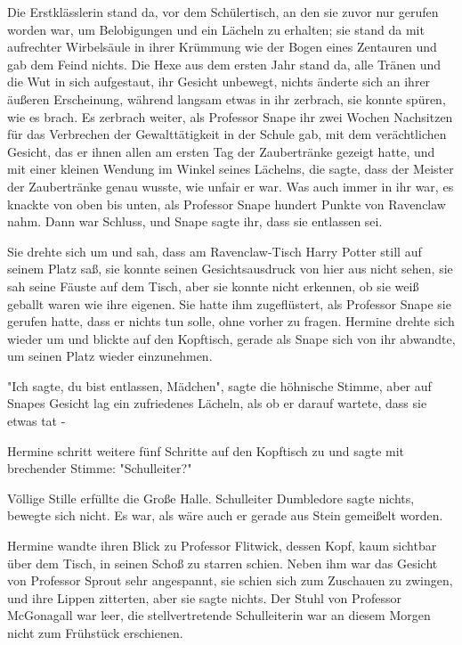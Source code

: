 {Die Erstklässlerin stand da, vor dem Schülertisch, an den sie zuvor nur gerufen worden war, um Belobigungen und ein Lächeln zu erhalten; sie stand da mit aufrechter Wirbelsäule in ihrer Krümmung wie der Bogen eines Zentauren und gab dem Feind nichts. Die Hexe aus dem ersten Jahr stand da, alle Tränen und die Wut in sich aufgestaut, ihr Gesicht unbewegt, nichts änderte sich an ihrer äußeren Erscheinung, während langsam etwas in ihr zerbrach, sie konnte spüren, wie es brach. Es zerbrach weiter, als Professor Snape ihr zwei Wochen Nachsitzen für das Verbrechen der Gewalttätigkeit in der Schule gab, mit dem verächtlichen Gesicht, das er ihnen allen am ersten Tag der Zaubertränke gezeigt hatte, und mit einer kleinen Wendung im Winkel seines Lächelns, die sagte, dass der Meister der Zaubertränke genau wusste, wie unfair er war. Was auch immer in ihr war, es knackte von oben bis unten, als Professor Snape hundert Punkte von Ravenclaw nahm. Dann war Schluss, und Snape sagte ihr, dass sie entlassen sei.

Sie drehte sich um und sah, dass am Ravenclaw-Tisch Harry Potter still auf seinem Platz saß, sie konnte seinen Gesichtsausdruck von hier aus nicht sehen, sie sah seine Fäuste auf dem Tisch, aber sie konnte nicht erkennen, ob sie weiß geballt waren wie ihre eigenen. Sie hatte ihm zugeflüstert, als Professor Snape sie gerufen hatte, dass er nichts tun solle, ohne vorher zu fragen. Hermine drehte sich wieder um und blickte auf den Kopftisch, gerade als Snape sich von ihr abwandte, um seinen Platz wieder einzunehmen.

"Ich sagte, du bist entlassen, Mädchen", sagte die höhnische Stimme, aber auf Snapes Gesicht lag ein zufriedenes Lächeln, als ob er darauf wartete, dass sie etwas tat -

Hermine schritt weitere fünf Schritte auf den Kopftisch zu und sagte mit brechender Stimme: "Schulleiter?"

Völlige Stille erfüllte die Große Halle. Schulleiter Dumbledore sagte nichts, bewegte sich nicht. Es war, als wäre auch er gerade aus Stein gemeißelt worden.

Hermine wandte ihren Blick zu Professor Flitwick, dessen Kopf, kaum sichtbar über dem Tisch, in seinen Schoß zu starren schien. Neben ihm war das Gesicht von Professor Sprout sehr angespannt, sie schien sich zum Zuschauen zu zwingen, und ihre Lippen zitterten, aber sie sagte nichts. Der Stuhl von Professor McGonagall war leer, die stellvertretende Schulleiterin war an diesem Morgen nicht zum Frühstück erschienen.

}
